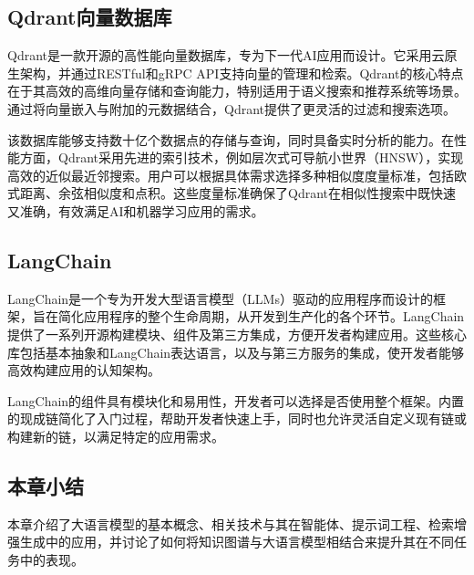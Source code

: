 \subsection{Qdrant向量数据库}

Qdrant是一款开源的高性能向量数据库，专为下一代AI应用而设计。它采用云原生架构，并通过RESTful和gRPC API支持向量的管理和检索。Qdrant的核心特点在于其高效的高维向量存储和查询能力，特别适用于语义搜索和推荐系统等场景。通过将向量嵌入与附加的元数据结合，Qdrant提供了更灵活的过滤和搜索选项。

该数据库能够支持数十亿个数据点的存储与查询，同时具备实时分析的能力。在性能方面，Qdrant采用先进的索引技术，例如层次式可导航小世界（HNSW），实现高效的近似最近邻搜索。用户可以根据具体需求选择多种相似度度量标准，包括欧式距离、余弦相似度和点积。这些度量标准确保了Qdrant在相似性搜索中既快速又准确，有效满足AI和机器学习应用的需求。

\subsection{LangChain}

LangChain是一个专为开发大型语言模型（LLMs）驱动的应用程序而设计的框架，旨在简化应用程序的整个生命周期，从开发到生产化的各个环节。LangChain提供了一系列开源构建模块、组件及第三方集成，方便开发者构建应用。这些核心库包括基本抽象和LangChain表达语言，以及与第三方服务的集成，使开发者能够高效构建应用的认知架构。

LangChain的组件具有模块化和易用性，开发者可以选择是否使用整个框架。内置的现成链简化了入门过程，帮助开发者快速上手，同时也允许灵活自定义现有链或构建新的链，以满足特定的应用需求。

\subsection{本章小结}
本章介绍了大语言模型的基本概念、相关技术与其在智能体、提示词工程、检索增强生成中的应用，并讨论了如何将知识图谱与大语言模型相结合来提升其在不同任务中的表现。